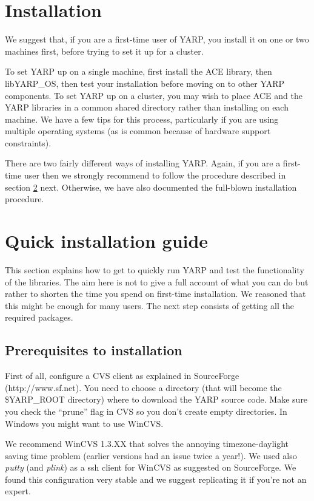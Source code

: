 
\section{Installation}

\label{sect:install}

We suggest that, if you are a first-time user of YARP, you install it
on one or two machines first, before trying to set it up for a cluster.

To set YARP up on a single machine, first install the ACE library,
then libYARP\_OS, then test your installation before moving on to 
other YARP components.  To set YARP up on a cluster, you may 
wish to place ACE and the YARP libraries in a common shared directory
rather than installing on each machine.  We have a few tips for this 
process, particularly if you are using multiple operating systems (as
is common because of hardware support constraints).

There are two fairly different ways of installing YARP. Again, if you are a first-time user then we strongly recommend to follow the procedure described in section \ref{sect:easy} next. Otherwise, we have also documented the full-blown installation procedure.

\section{Quick installation guide}
\label{sect:easy}

This section explains how to get to quickly run YARP and test the functionality of the libraries. The aim here is not to give a full account of what you can do but rather to shorten the time you spend on first-time installation. We reasoned that this might be enough for many users. The next step consists of getting all the required packages.

\subsection{Prerequisites to installation}

First of all, configure a CVS client as explained in SourceForge (http://www.sf.net).
You need to choose a directory (that will become the \$YARP\_ROOT directory) where to download the YARP source code. Make sure you check the ``prune'' flag in CVS so you don't create empty directories. In Windows you might want to use WinCVS.

We recommend WinCVS 1.3.XX that solves the annoying timezone-daylight saving time
problem (earlier versions had an issue twice a year!). We used also {\em putty} (and {\em plink}) as a ssh client for WinCVS as suggested on SourceForge. We found this configuration very stable and we suggest replicating it if you're not an expert. 

